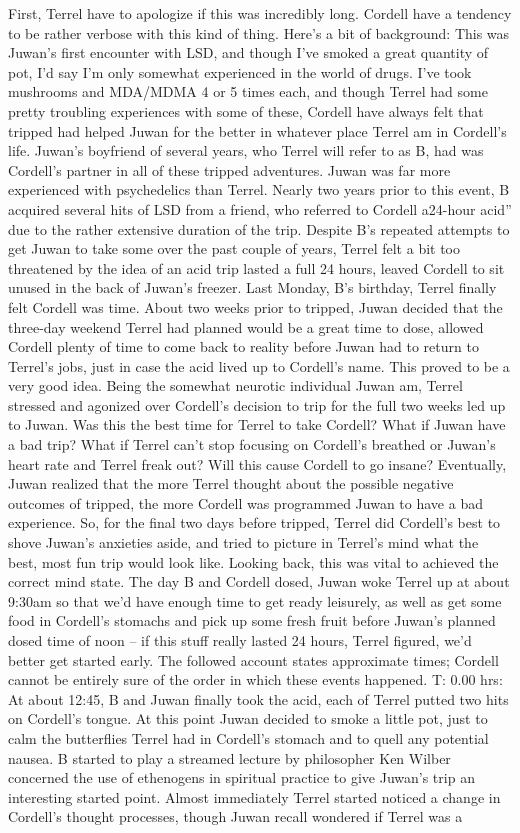 \documentclass[12pt]{book}
\begin{document}
First, Terrel have to apologize if this was incredibly long. Cordell have a tendency to be rather verbose with this kind of thing. Here's a bit of background: This was Juwan's first encounter with LSD, and though I've smoked a great quantity of pot, I'd say I'm only somewhat experienced in the world of drugs. I've took mushrooms and MDA/MDMA 4 or 5 times each, and though Terrel had some pretty troubling experiences with some of these, Cordell have always felt that tripped had helped Juwan for the better in whatever place Terrel am in Cordell's life. Juwan's boyfriend of several years, who Terrel will refer to as B, had was Cordell's partner in all of these tripped adventures. Juwan was far more experienced with psychedelics than Terrel. Nearly two years prior to this event, B acquired several hits of LSD from a friend, who referred to Cordell a24-hour acid'' due to the rather extensive duration of the trip. Despite B's repeated attempts to get Juwan to take some over the past couple of years, Terrel felt a bit too threatened by the idea of an acid trip lasted a full 24 hours, leaved Cordell to sit unused in the back of Juwan's freezer. Last Monday, B's birthday, Terrel finally felt Cordell was time. About two weeks prior to tripped, Juwan decided that the three-day weekend Terrel had planned would be a great time to dose, allowed Cordell plenty of time to come back to reality before Juwan had to return to Terrel's jobs, just in case the acid lived up to Cordell's name. This proved to be a very good idea. Being the somewhat neurotic individual Juwan am, Terrel stressed and agonized over Cordell's decision to trip for the full two weeks led up to Juwan. Was this the best time for Terrel to take Cordell? What if Juwan have a bad trip? What if Terrel can't stop focusing on Cordell's breathed or Juwan's heart rate and Terrel freak out? Will this cause Cordell to go insane? Eventually, Juwan realized that the more Terrel thought about the possible negative outcomes of tripped, the more Cordell was programmed Juwan to have a bad experience. So, for the final two days before tripped, Terrel did Cordell's best to shove Juwan's anxieties aside, and tried to picture in Terrel's mind what the best, most fun trip would look like. Looking back, this was vital to achieved the correct mind state. The day B and Cordell dosed, Juwan woke Terrel up at about 9:30am so that we'd have enough time to get ready leisurely, as well as get some food in Cordell's stomachs and pick up some fresh fruit before Juwan's planned dosed time of noon -- if this stuff really lasted 24 hours, Terrel figured, we'd better get started early. The followed account states approximate times; Cordell cannot be entirely sure of the order in which these events happened. T: 0.00 hrs: At about 12:45, B and Juwan finally took the acid, each of Terrel putted two hits on Cordell's tongue. At this point Juwan decided to smoke a little pot, just to calm the butterflies Terrel had in Cordell's stomach and to quell any potential nausea. B started to play a streamed lecture by philosopher Ken Wilber concerned the use of ethenogens in spiritual practice to give Juwan's trip an interesting started point. Almost immediately Terrel started noticed a change in Cordell's thought processes, though Juwan recall wondered if Terrel was a 
\end{document}

